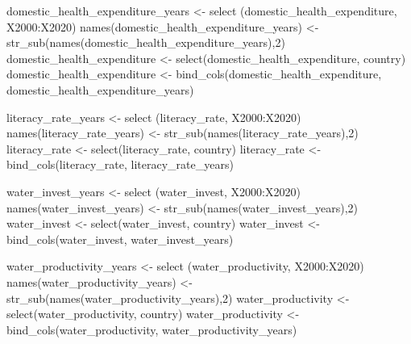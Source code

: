 \documentclass[
]{article}
\newenvironment{Shaded}{\begin{snugshade}}{\end{snugshade}}
\newcommand{\DecValTok}[1]{\textcolor[rgb]{0.00,0.00,0.81}{#1}}
\newcommand{\FunctionTok}[1]{\textcolor[rgb]{0.00,0.00,0.00}{#1}}
\newcommand{\NormalTok}[1]{#1}
\newcommand{\OtherTok}[1]{\textcolor[rgb]{0.56,0.35,0.01}{#1}}
\newcommand{\SpecialCharTok}[1]{\textcolor[rgb]{0.00,0.00,0.00}{#1}}
\newcommand{\StringTok}[1]{\textcolor[rgb]{0.31,0.60,0.02}{#1}}
\begin{document}
\begin{Shaded}
\begin{Highlighting}[]
\NormalTok{domestic\_health\_expenditure\_years }\OtherTok{\textless{}{-}} \FunctionTok{select}\NormalTok{ (domestic\_health\_expenditure, }\StringTok{\textquotesingle{}X2000\textquotesingle{}}\SpecialCharTok{:}\StringTok{\textquotesingle{}X2020\textquotesingle{}}\NormalTok{)}
\FunctionTok{names}\NormalTok{(domestic\_health\_expenditure\_years) }\OtherTok{\textless{}{-}} \FunctionTok{str\_sub}\NormalTok{(}\FunctionTok{names}\NormalTok{(domestic\_health\_expenditure\_years),}\DecValTok{2}\NormalTok{)}
\NormalTok{domestic\_health\_expenditure }\OtherTok{\textless{}{-}} \FunctionTok{select}\NormalTok{(domestic\_health\_expenditure, country)}
\NormalTok{domestic\_health\_expenditure }\OtherTok{\textless{}{-}} \FunctionTok{bind\_cols}\NormalTok{(domestic\_health\_expenditure, domestic\_health\_expenditure\_years)}

\NormalTok{literacy\_rate\_years }\OtherTok{\textless{}{-}} \FunctionTok{select}\NormalTok{ (literacy\_rate, }\StringTok{\textquotesingle{}X2000\textquotesingle{}}\SpecialCharTok{:}\StringTok{\textquotesingle{}X2020\textquotesingle{}}\NormalTok{)}
\FunctionTok{names}\NormalTok{(literacy\_rate\_years) }\OtherTok{\textless{}{-}} \FunctionTok{str\_sub}\NormalTok{(}\FunctionTok{names}\NormalTok{(literacy\_rate\_years),}\DecValTok{2}\NormalTok{)}
\NormalTok{literacy\_rate }\OtherTok{\textless{}{-}} \FunctionTok{select}\NormalTok{(literacy\_rate, country)}
\NormalTok{literacy\_rate }\OtherTok{\textless{}{-}} \FunctionTok{bind\_cols}\NormalTok{(literacy\_rate, literacy\_rate\_years)}

\NormalTok{water\_invest\_years }\OtherTok{\textless{}{-}} \FunctionTok{select}\NormalTok{ (water\_invest, }\StringTok{\textquotesingle{}X2000\textquotesingle{}}\SpecialCharTok{:}\StringTok{\textquotesingle{}X2020\textquotesingle{}}\NormalTok{)}
\FunctionTok{names}\NormalTok{(water\_invest\_years) }\OtherTok{\textless{}{-}} \FunctionTok{str\_sub}\NormalTok{(}\FunctionTok{names}\NormalTok{(water\_invest\_years),}\DecValTok{2}\NormalTok{)}
\NormalTok{water\_invest }\OtherTok{\textless{}{-}} \FunctionTok{select}\NormalTok{(water\_invest, country)}
\NormalTok{water\_invest }\OtherTok{\textless{}{-}} \FunctionTok{bind\_cols}\NormalTok{(water\_invest, water\_invest\_years)}

\NormalTok{water\_productivity\_years }\OtherTok{\textless{}{-}} \FunctionTok{select}\NormalTok{ (water\_productivity, }\StringTok{\textquotesingle{}X2000\textquotesingle{}}\SpecialCharTok{:}\StringTok{\textquotesingle{}X2020\textquotesingle{}}\NormalTok{)}
\FunctionTok{names}\NormalTok{(water\_productivity\_years) }\OtherTok{\textless{}{-}} \FunctionTok{str\_sub}\NormalTok{(}\FunctionTok{names}\NormalTok{(water\_productivity\_years),}\DecValTok{2}\NormalTok{)}
\NormalTok{water\_productivity }\OtherTok{\textless{}{-}} \FunctionTok{select}\NormalTok{(water\_productivity, country)}
\NormalTok{water\_productivity }\OtherTok{\textless{}{-}} \FunctionTok{bind\_cols}\NormalTok{(water\_productivity, water\_productivity\_years)}
\end{Highlighting}
\end{Shaded}
\end{document}
